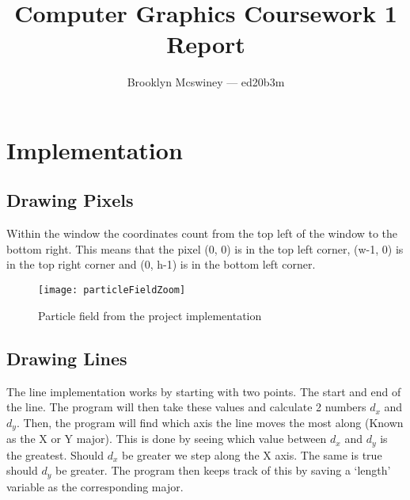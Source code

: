 \documentclass[
	a4paper, %
	10pt, %
]{CSUniSchoolLabReport}
\newcommand{\subtitle}[1]{%
  \posttitle{%
    \par\end{center}
    \begin{center}\large#1\end{center}
    \vskip0.5em}%
}
\begin{document}
\title{Computer Graphics Coursework 1 Report} %
\subtitle{COMP3811}
\author{Brooklyn Mcswiney --- ed20b3m} %

\date{ }

\maketitle %

\noindent\makebox[\linewidth]{\rule{\paperwidth}{0.4pt}}

\tableofcontents

\pagebreak

\section{Implementation}

\subsection{Drawing Pixels}

Within the window the coordinates count from the top left of the window
to the bottom right. This means that the pixel (0, 0) is in the top left
corner, (w-1, 0) is in the top right corner and (0, h-1) is in the 
bottom left corner.

\begin{figure}[h]
	\centering
	\texttt{[image: particleFieldZoom]}
	\caption{Particle field from the project implementation}
\end{figure}

\subsection{Drawing Lines}
\begin{flushleft}
	The line implementation works by starting with two points. The start and
	end of the line. The program will then take these values and calculate 2
	numbers \(d_x\) and \( d_y\). Then, the program will find which axis the
	line moves the most along (Known as the X or Y major). This is done by
	seeing which value between \(d_x\) and \( d_y\) is the greatest. Should \(d_x\)
	be greater we step along the X axis. The same is true should \(d_y\) be greater.
	The program then keeps track of this by saving a `length' variable as the corresponding 
	major.
\end{flushleft}
\end{document}
